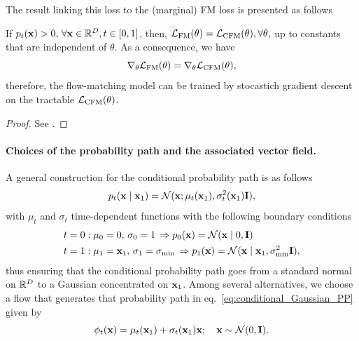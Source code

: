 The result linking this loss to the (marginal) FM loss is presented as follows 

\begin{theorem}
    \label{thm:lipman_CFM}
    If $p_t({ \mathbf{x}})>0,\, \forall { \mathbf{x}}\in{\mathbb R}^D, t\in[0,1]$, then, ${\mathcal L}_\text{FM}(\theta) = {\mathcal L}_\text{CFM}(\theta), \forall \theta, $ up to constants that are independent of $\theta$. As a consequence, we have 
    \[
    \nabla_\theta {\mathcal L}_\text{FM}(\theta) = \nabla_\theta{\mathcal L}_\text{CFM}(\theta),
    \]
    therefore, the flow-matching model can be trained by stocastich gradient descent on the tractable ${\mathcal L}_\text{CFM}(\theta)$.
\end{theorem}

\begin{proof}
    See \cite[Appendix]{lipman2023flowmatching}.
\end{proof}

\paragraph{Choices of the probability path and the associated vector field.} A general construction for the conditional probability path is as follows
\begin{equation}
    \label{eq:conditional_Gaussian_PP}
    p_t({ \mathbf{x}} \mid { \mathbf{x}}_1) = {\mathcal N}({ \mathbf{x}} ; \mu_t({ \mathbf{x}}_1), \sigma_t^2({ \mathbf{x}}_1){\mathbf I}), 
\end{equation}
with $\mu_t$ and $\sigma_t$ time-dependent functions with the following boundary conditions
\begin{align}
    t=0 &:  \mu_0=0,\,\sigma_0= 1\, \Rightarrow p_0({ \mathbf{x}}) = {\mathcal N}({ \mathbf{x}} \mid 0,{\mathbf I})\\
    t=1 &: \mu_1={ \mathbf{x}}_1,\,\sigma_1= \sigma_\text{min}\, \Rightarrow p_1({ \mathbf{x}}) = {\mathcal N}({ \mathbf{x}} \mid { \mathbf{x}}_1,\sigma^2_\text{min}{\mathbf I}),
\end{align}
thus ensuring that the conditional probability path goes from a standard normal on ${\mathbb R}^D$ to a Gaussian concentrated on ${ \mathbf{x}}_1$. Among several alternatives, we choose a flow that generates that probability path in eq.~\eqref{eq:conditional_Gaussian_PP} given by 
\begin{equation}
    \label{eq:conditional_Gaussian_flow}
    \phi_t({ \mathbf{x}}) = \mu_t({ \mathbf{x}}_1) + \sigma_t({ \mathbf{x}}_1){ \mathbf{x}}; \quad { \mathbf{x}}\sim{\mathcal N}(0,{\mathbf I}).
\end{equation}



